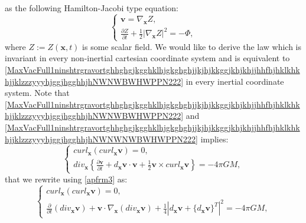 \documentclass{article}
\theoremstyle{definition}
\theoremstyle{remark}
\renewcommand{\vec}[1]{\mathbf{#1}}
\newcommand{\er}{\eqref}
\newcommand{\er}{\eqref}
\begin{document}
as the following Hamilton-Jacobi type equation:
\begin{equation}
\label{MaxVacFull1ninshtrgravortghhghgjkgghklhjgkghghjjkjhjkkggjkhjkhjjhhfhjhklkhkhjjklzzzyyyhjggjhgghhjhNWNWNWNWNWBWHWPPN222}
\begin{cases}
\vec v=\nabla_{\vec x}Z,\\
\frac{\partial Z}{\partial t}+\frac{1}{2}\left|\nabla_{\vec
x}Z\right|^2=-\Phi,
\end{cases}
\end{equation}
where $Z:=Z(\vec x,t)$ is some scalar field. We would like to derive
the law which is invariant in every non-inertial cartesian
coordinate system and is equivalent to
\er{MaxVacFull1ninshtrgravortghhghgjkgghklhjgkghghjjkjhjkkggjkhjkhjjhhfhjhklkhkhjjklzzzyyyhjggjhgghhjhNWNWBWHWPPN222}
in every inertial coordinate system. Note that
\er{MaxVacFull1ninshtrgravortghhghgjkgghklhjgkghghjjkjhjkkggjkhjkhjjhhfhjhklkhkhjjklzzzyyyhjggjhgghhjhNWNWBWHWPPN222}
and
\er{MaxVacFull1ninshtrgravortghhghgjkgghklhjgkghghjjkjhjkkggjkhjkhjjhhfhjhklkhkhjjklzzzyyyhjggjhgghhjhNWNWNWBWHWPPN222}
implies:
\begin{equation}
\label{MaxVacFull1ninshtrgravortghhghgjkgghklhjgkghghjjkjhjkkggjkhjkhjjhhfhjhklkhkhjjklzzzyyyhjfgfkjgjNWBWHWPPN222}
\begin{cases}
curl_{\vec x}\left(curl_{\vec x}\vec v\right)= 0,\\
div_{\vec x}\left\{\frac{\partial\vec v}{\partial t}+d_\vec x\vec
v\cdot\vec v+\frac{1}{2}\vec v\times curl_{\vec x}\vec v\right\}
= -4\pi GM,
\end{cases}
\end{equation}
that we rewrite using \er{apfrm3} as:
\begin{equation}
\label{MaxVacFull1ninshtrgravortghhghgjkgghklhjgkghghjjkjhjkkggjkhjkhjjhhfhjhklkhkhjjklzzzyyyNWBWHWPPN222}
\begin{cases}
curl_{\vec x}\left(curl_{\vec x}\vec v\right)= 0,\\
\frac{\partial}{\partial t}\left(div_{\vec x}\vec v\right)+\vec
v\cdot\nabla_{\vec x}\left(div_{\vec x}\vec
v\right)+\frac{1}{4}\left|d_{\vec x}\vec v+\{d_{\vec x}\vec
v\}^T\right|^2= -4\pi GM,
\end{cases}
\end{equation}
\end{document}
